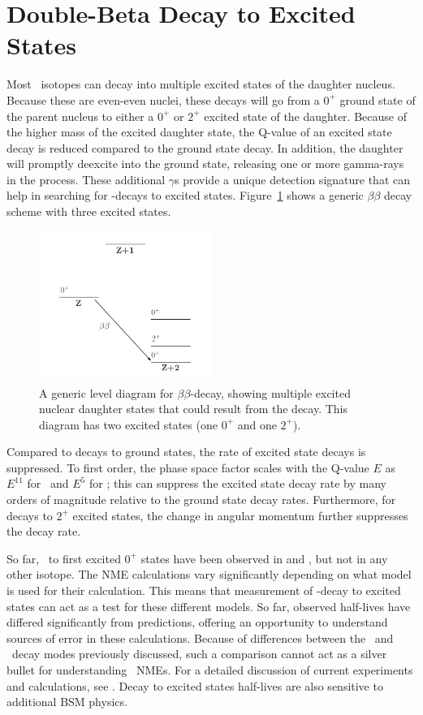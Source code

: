 \documentclass[/main.tex]{subfiles}
\begin{document}
\section{Double-Beta Decay to Excited States} \label{sec:bbestheory}
Most \bb\ isotopes can decay into multiple excited states of the daughter nucleus.
Because these are even-even nuclei, these decays will go from a $0^+$ ground state of the parent nucleus to either a $0^+$ or $2^+$ excited state of the daughter.
Because of the higher mass of the excited daughter state, the Q-value of an excited state decay is reduced compared to the ground state decay.
In addition, the daughter will promptly deexcite into the ground state, releasing one or more gamma-rays in the process.
These additional $\gamma$s provide a unique detection signature that can help in searching for \bb-decays to excited states.
Figure~\ref{fig:bbeslevelgeneric} shows a generic $\beta\beta$ decay scheme with three excited states.
\begin{figure}[t]
  \centering
  \includegraphics[width=0.5\textwidth]{bbesdecayscheme}
  \caption[Generic $\beta\beta$ to Excited States Level Diagram]{\label{fig:bbeslevelgeneric}
    A generic level diagram for $\beta\beta$-decay, showing multiple excited nuclear daughter states that could result from the decay. This diagram has two excited states (one $0^+$ and one $2^+$).
  }
\end{figure}

Compared to decays to ground states, the rate of excited state decays is suppressed.
To first order, the phase space factor scales with the Q-value $E$ as $E^{11}$ for \tnbb\ and $E^5$ for \znbb; this can suppress the excited state decay rate by many orders of magnitude relative to the ground state decay rates.
Furthermore, for decays to $2^+$ excited states, the change in angular momentum further suppresses the decay rate.

So far, \tnbb\ to first excited $0^+$ states have been observed in  and , but not in any other isotope.
The NME calculations vary significantly depending on what model is used for their calculation.
This means that measurement of \bb -decay to excited states can act as a test for these different models.
So far, observed half-lives have differed significantly from predictions, offering an opportunity to understand sources of error in these calculations.
Because of differences between the \tnbb\ and \znbb\ decay modes previously discussed, such a comparison cannot act as a silver bullet for understanding \znbb\ NMEs.
For a detailed discussion of current experiments and calculations, see \cite{barabash2017}.
Decay to excited states half-lives are also sensitive to additional BSM physics.
\end{document}
